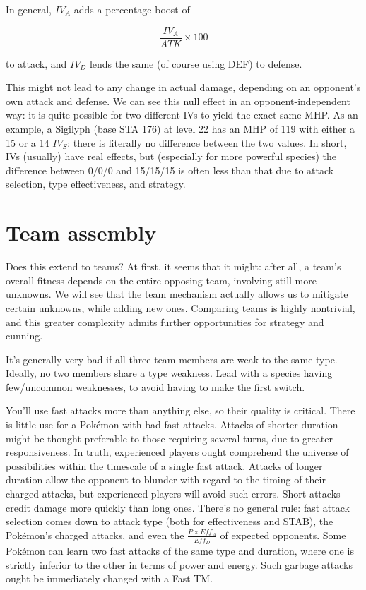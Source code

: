In general, $IV_A$ adds a percentage boost of

\[ \frac{IV_A}{ATK} \times 100 \]

\noindent{}to attack, and $IV_D$ lends the same (of course using DEF) to defense.

This might not lead to any change in actual damage, depending on
  an opponent's own attack and defense.
We can see this null effect in an opponent-independent way: it is quite possible
  for two different IVs to yield the exact same MHP.
As an example, a Sigilyph (base STA 176) at level 22 has an MHP of 119 with
  either a 15 or a 14 $IV_S$: there is literally no difference between the
  two values.
In short, IVs (usually) have real effects, but (especially for more powerful species)
  the difference between 0/0/0 and 15/15/15 is often less than that due to
  attack selection, type effectiveness, and strategy.

\section{Team assembly}
Does this extend to teams?
At first, it seems that it might: after all, a team's overall fitness
 depends on the entire opposing team, involving still more unknowns.
We will see that the team mechanism actually allows us to mitigate certain
 unknowns, while adding new ones.
Comparing teams is highly nontrivial, and this greater complexity admits
 further opportunities for strategy and cunning.

It's generally very bad if all three team members are weak to the same type.
Ideally, no two members share a type weakness.
Lead with a species having few/uncommon weaknesses, to avoid having to make the first switch.

You'll use fast attacks more than anything else, so their quality is critical.
There is little use for a Pokémon with bad fast attacks.
Attacks of shorter duration might be thought preferable to those requiring
  several turns, due to greater responsiveness.
In truth, experienced players ought comprehend the universe of possibilities
  within the timescale of a single fast attack.
Attacks of longer duration allow the opponent to blunder with regard to the
  timing of their charged attacks, but experienced players will avoid
  such errors.
Short attacks credit damage more quickly than long ones.
There's no general rule: fast attack selection comes down to attack type
  (both for effectiveness and STAB), the Pokémon's charged attacks,
  and even the $\frac{P \times Eff_A}{Eff_D}$ of expected opponents.
Some Pokémon can learn two fast attacks of the same type and duration,
  where one is strictly inferior to the other in terms of power and
  energy.
Such garbage attacks ought be immediately changed with a Fast TM\@.


